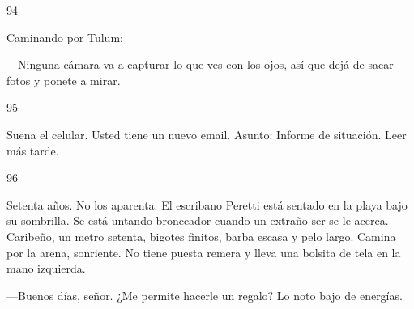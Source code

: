 \documentclass[12pt,twoside,openright,a5paper]{book}
\begin{document}
\vspace{0.5cm}
\afterpage{}
\hrulefill \hspace{0.1cm}\decofourleft\hspace{0.2cm} 94 \hspace{0.2cm}\decofourright \hspace{0.1cm}\hrulefill

\nopagebreak

\vspace{0.5cm}

\nopagebreak

Caminando por Tulum:

---Ninguna cámara va a capturar lo que ves con los ojos,
así que dejá de sacar fotos y ponete a mirar.

\vspace{0.5cm}

\hrulefill \hspace{0.1cm}\decofourleft\hspace{0.2cm} 95 \hspace{0.2cm}\decofourright \hspace{0.1cm}\hrulefill

\nopagebreak

\vspace{0.5cm}

\nopagebreak

Suena el celular. Usted tiene un nuevo email. Asunto: Informe de situación. Leer más tarde.


\vspace{0.5cm}

\hrulefill \hspace{0.1cm}\decofourleft\hspace{0.2cm} 96 \hspace{0.2cm}\decofourright \hspace{0.1cm}\hrulefill

\nopagebreak

\vspace{0.5cm}

\nopagebreak

Setenta años. No los aparenta. El escribano Peretti está sentado en la
playa bajo  su sombrilla. Se está untando bronceador cuando un extraño ser
se le acerca.  Caribeño, un metro setenta, bigotes finitos, barba escasa
y pelo largo. Camina por la arena, sonriente. No
tiene puesta remera y lleva una bolsita de tela en la mano izquierda.

---Buenos días, señor. ¿Me permite hacerle un regalo? Lo noto bajo de
energías.
\end{document}
